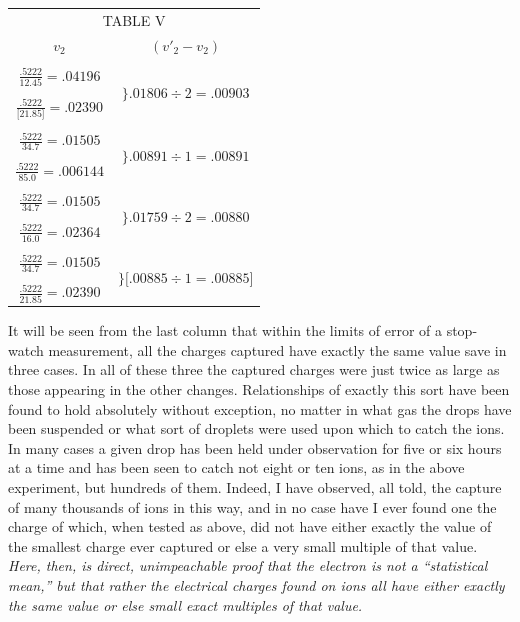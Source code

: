 \begin{center}
\begin{tabular}{ c c }
  \multicolumn{2}{c}{TABLE V\footnotemark}\\
  $v_2$ & $ (v'_2 - v_2)$\\
  &\\
  $\frac{.5222}{12.45} = .04196$ & \multirow{3}{*}{$\} .01806 \div 2 = .00903$}\\
  &\\
  $\frac{.5222}{{[}21.85{]}} = .02390$ &\multirow{3}{*}{$\} .00885 \div 1 = .00885$}\\
  &\\
  $\frac{.5222}{34.7} = .01505$ &\multirow{3}{*}{$\} .00891 \div 1 = .00891$}\\
  &\\
  $\frac{.5222}{85.0} = .006144$ &\multirow{3}{*}{$\} .00891 \div 1 = .00891$}\\
  &\\
  $\frac{.5222}{34.7} = .01505$ &\multirow{3}{*}{$\} .01759 \div 2 = .00880$}\\
  &\\
  $\frac{.5222}{16.0} = .02364$ &\multirow{3}{*}{$\} .01759 \div 2 = .00880$}\\
  &\\
  $\frac{.5222}{34.7} = .01505$ &\multirow{3}{*}{$\} {[}.00885 \div 1 = .00885{]}$}\\
  &\\
  $\frac{.5222}{21.85} = .02390$ &\\
\end{tabular}
\end{center}

It will be seen from the last column that within the limits of error of
a stop-watch measurement, all the charges captured have exactly the same
value save in three cases. In all of these three the captured charges
were just twice as large as those appearing in the other changes.
Relationships of exactly this sort have been found to hold absolutely
without exception, no matter in what gas the drops have been suspended
or what sort of droplets were used upon which to catch the ions. In many
cases a given drop has been held under observation for five or six hours
at a time and has been seen to catch not eight or ten ions, as in the
above experiment, but hundreds of them. Indeed, I have observed, all
told, the capture of many thousands of ions in this way, and in no case
have I ever found one the charge of which, when tested as above, did not
have either exactly the value of the smallest charge ever captured or
else a very small multiple of that value. \emph{Here, then, is direct,
unimpeachable proof that the electron is not a ``statistical mean,'' but
that rather the electrical charges found on ions all have either exactly
the same value or else small exact multiples of that value.}


